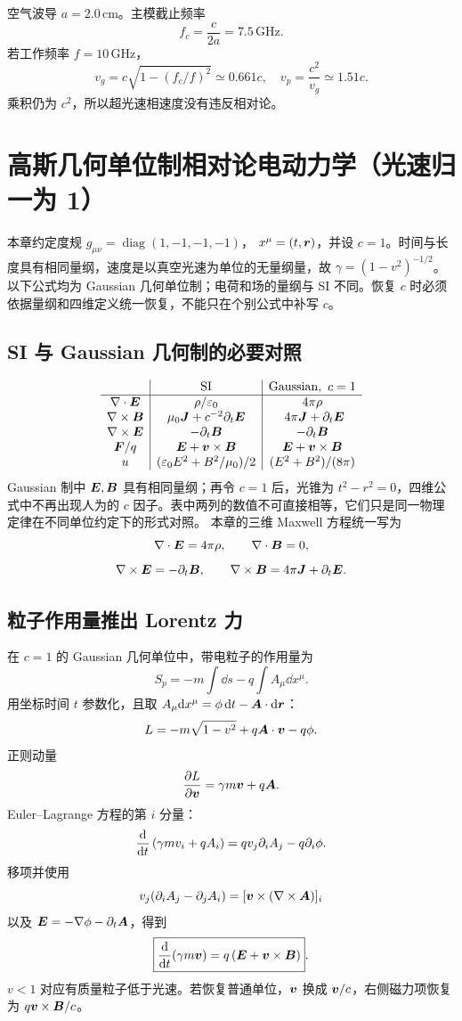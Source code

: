 \begin{examplebox}[title=TE$_{10}$ 的截止与色散]
空气波导 $a=2.0\,\mathrm{cm}$。主模截止频率
\[
f_c=\frac{c}{2a}=7.5\,\mathrm{GHz}.
\]
若工作频率 $f=10\,\mathrm{GHz}$，
\[
v_g=c\sqrt{1-(f_c/f)^2}\simeq0.661c,
\quad
v_p=\frac{c^2}{v_g}\simeq1.51c.
\]
乘积仍为 $c^2$，所以超光速相速度没有违反相对论。
\end{examplebox}

\chapter{高斯几何单位制相对论电动力学（光速归一为 1）}

\begin{prereqbox}
本章约定度规 $g_{\mu\nu}=\operatorname{diag}(1,-1,-1,-1)$，
$x^\mu=(t,\bm{r})$，并设 $c=1$。时间与长度具有相同量纲，速度是以真空光速为单位的无量纲量，故
$\gamma=(1-v^2)^{-1/2}$。以下公式均为 Gaussian 几何单位制；电荷和场的量纲与 SI 不同。恢复 $c$ 时必须依据量纲和四维定义统一恢复，不能只在个别公式中补写 $c$。
\end{prereqbox}

\section{SI 与 Gaussian 几何制的必要对照}
\[
\begin{array}{c|c|c}
&\mathrm{SI}&\mathrm{Gaussian},\ c=1\\ \hline
\nabla\cdot\bm{E}&\rho/\varepsilon_0&4\pi\rho\\
\nabla\times\bm{B}&\mu_0\bm{J}+c^{-2}\partial_t\bm{E}&
\ 4\pi\bm{J}+\partial_t\bm{E}\\
\nabla\times\bm{E}&-\partial_t\bm{B}&-\partial_t\bm{B}\\
\bm{F}/q&\bm{E}+\bm{v}\times\bm{B}&
\bm{E}+\bm{v}\times\bm{B}\\
u&(\varepsilon_0E^2+B^2/\mu_0)/2&(E^2+B^2)/(8\pi)
\end{array}
\]
Gaussian 制中 $\bm{E},\bm{B}$ 具有相同量纲；再令 $c=1$ 后，光锥为
$t^2-r^2=0$，四维公式中不再出现人为的 $c$ 因子。表中两列的数值不可直接相等，它们只是同一物理定律在不同单位约定下的形式对照。
本章的三维 Maxwell 方程统一写为
\[
\nabla\cdot\bm{E}=4\pi\rho,\qquad
\nabla\cdot\bm{B}=0,
\]
\[
\nabla\times\bm{E}=-\partial_t\bm{B},\qquad
\nabla\times\bm{B}=4\pi\bm{J}+\partial_t\bm{E}.
\]

\section{粒子作用量推出 Lorentz 力}
在 $c=1$ 的 Gaussian 几何单位中，带电粒子的作用量为
\[
\boxed{S_p=-m\int\dd s-q\int A_\mu\dd x^\mu}.
\]
用坐标时间 $t$ 参数化，且取
$A_\mu\mathrm d x^\mu=\phi\,\mathrm d t-\bm{A}\cdot\mathrm d\bm{r}$：
\[
L=-m\sqrt{1-v^2}+q\bm{A}\cdot\bm{v}-q\phi.
\]
正则动量
\[
\frac{\partial L}{\partial \bm{v}}=\gamma m\bm{v}+q\bm{A}.
\]
Euler--Lagrange 方程的第 $i$ 分量：
\[
\frac{\mathrm d }{\mathrm d t}\left(\gamma mv_i+qA_i\right)
=qv_j\partial_iA_j-q\partial_i\phi.
\]
移项并使用
\[
v_j(\partial_iA_j-\partial_jA_i)
=[\bm{v}\times(\nabla\times\bm{A})]_i
\]
以及
$\bm{E}=-\nabla\phi-\partial_t\bm{A}$，得到
\[
\boxed{\frac{\mathrm d }{\mathrm d t}(\gamma m\bm{v})
=q\left(\bm{E}+\bm{v}\times\bm{B}\right)}.
\]
$v<1$ 对应有质量粒子低于光速。若恢复普通单位，$\bm{v}$ 换成
$\bm{v}/c$，右侧磁力项恢复为 $q\bm{v}\times\bm{B}/c$。

